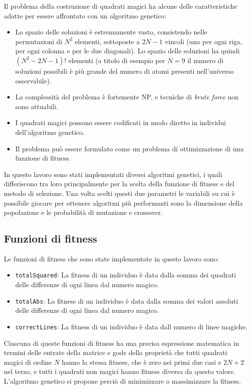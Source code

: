 \documentclass[italian,twoside,twocolumn]{article}
\begin{document}
\noindent
Il problema della costruzione di quadrati magici ha alcune delle caratteristiche adatte per essere affrontato con un algoritmo genetico:
\begin{itemize}
	\item Lo spazio delle soluzioni è estremamente vasto, consistendo nelle permutazioni di $ N^2 $ elementi, sottoposte a $ 2 N - 1 $ vincoli (uno per ogni riga, per ogni colonna e per le due diagonali). Lo spazio delle soluzioni ha quindi $ (N^2 - 2N - 1)! $ elementi (a titolo di esempio per $ N = 9 $ il numero di soluzioni possibili è più grande del numero di atomi presenti nell'universo osservabile). 
	\item La complessità del problema è fortemente NP, e tecniche di \emph{brute force} non sono attuabili.
	\item I quadrati magici possono essere codificati in modo diretto in individui dell'algoritmo genetico.
	\item Il problema può essere formulato come un problema di ottimizzazione di una funzione di fitness.
\end{itemize}
In questo lavoro sono stati implementati diversi algoritmi genetici, i quali differiscono tra loro principalmente per la scelta della funzione di fitness e del metodo di selezione. Una volta scelti questi due parametri le variabili su cui è possibile giocare per ottenere algoritmi più performanti sono la dimensione della popolazione e le probabilità di mutazione e crossover. 

\subsection{Funzioni di fitness}
Le funzioni di fitness che sono state implementate in questo lavoro sono: 
\begin{itemize}
	\item \texttt{totalSquared}: La fitness di un individuo è data dalla somma dei quadrati delle differenze di ogni linea dal numero magico.
	\item \texttt{totalAbs}: La fitness di un individuo è data dalla somma dei valori assoluti delle differenze di ogni linea dal numero magico.
	\item \texttt{correctLines}: La fitness di un individuo è data dall numero di linee magiche. 
\end{itemize}
Ciascuna di queste funzioni di fitness ha una precisa espressione matematica in termini delle entrate della matrice e gode della proprietà che tutti quadrati magici di ordine $ N $ hanno la stessa fitness, che è zero nei primi due casi e $ 2N + 2 $ nel terzo, e tutti i quadrati non magici hanno fitness diversa da questo valore. L'algoritmo genetico si propone perciò di minimizzare o massimizzare la fitness.
\end{document}
